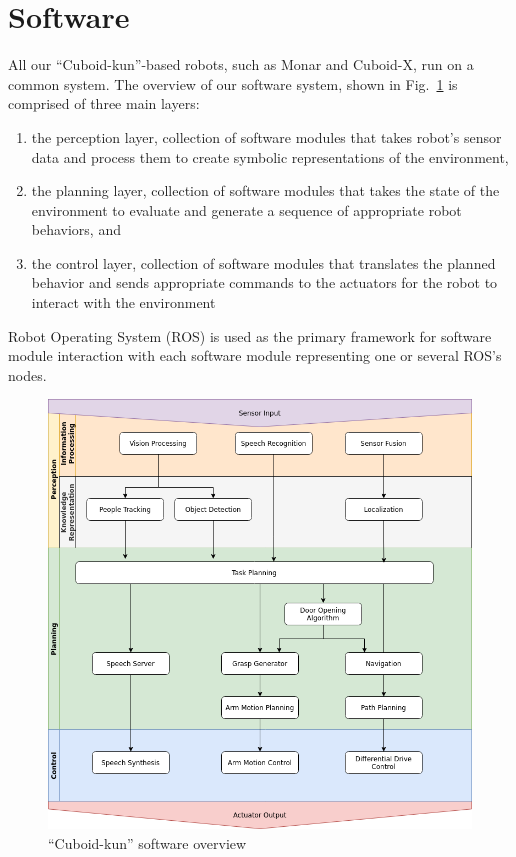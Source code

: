 \documentclass[runningheads,a4paper]{llncs}
\begin{document}
\section{Software}
All our ``Cuboid-kun''-based robots, such as Monar and Cuboid-X, run on a common system.
The overview of our software system, shown in Fig.~\ref{fig:software} is comprised of three main layers:
\begin{enumerate}
    \item the perception layer, collection of software modules that takes robot’s sensor data and process them to create symbolic representations of the environment,
    \item the planning layer, collection of software modules that takes the state of the environment to evaluate and generate a sequence of appropriate robot behaviors, and
    \item the control layer, collection of software modules that translates the planned behavior and sends appropriate commands to the actuators for the robot to interact with the environment
\end{enumerate}
Robot Operating System (ROS) is used as the primary framework for software module interaction with each software module representing one or several ROS’s nodes.
\begin{figure}[tbp]
    \centering
    \includegraphics[width=0.6\linewidth]{images/SoftwareOverview.png}
    \caption{``Cuboid-kun'' software overview}
    \label{fig:software}
\end{figure}
\end{document}
